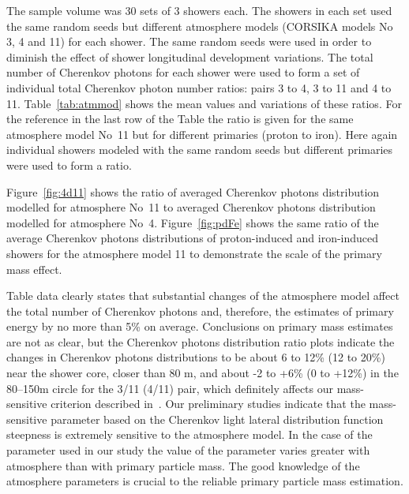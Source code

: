 \documentclass[universe,article,submit,moreauthors,pdftex]{Definitions/mdpi}
\begin{document}
\begin{paracol}{2}
The sample volume was 30 sets of 3 showers each. The showers in each set used the same random seeds but different atmosphere models (CORSIKA models No 3, 4 and 11) for each shower. The same random seeds were used in order to diminish the effect of shower longitudinal development variations. The total number of Cherenkov photons for each shower were used to form a set of individual total Cherenkov photon number ratios: pairs 3 to 4, 3 to 11 and 4 to 11. Table~\ref{tab:atmmod} shows the mean values and variations of these ratios. For the reference in the last row of the Table the ratio is given for the same atmosphere model No~11 but for different primaries (proton to iron). Here again individual showers modeled with the same random seeds but different primaries were used to form a ratio. 

Figure~\ref{fig:4d11} shows the ratio of averaged Cherenkov photons distribution modelled for atmosphere No~11 to averaged Cherenkov photons distribution modelled for atmosphere No~4. Figure~\ref{fig:pdFe} shows the same ratio of the average Cherenkov photons distributions of proton-induced and iron-induced showers for the atmosphere model 11 to demonstrate the scale of the primary mass effect.


Table data clearly states that substantial changes of the atmosphere model affect the total number of Cherenkov photons and, therefore, the estimates of primary energy by no more than 5\% on average. Conclusions on primary mass estimates are not as clear, but the Cherenkov photons distribution ratio plots indicate the changes in Cherenkov photons distributions to be about 6 to 12\% (12 to 20\%) near the shower core, closer than 80 m, and about -2 to +6\% (0 to +12\%) in the 80--150m circle for the 3/11 (4/11) pair, which definitely affects our mass-sensitive criterion described in~\cite{Ant15c}. Our preliminary studies indicate that the mass-sensitive parameter based on the Cherenkov light lateral distribution function steepness is extremely sensitive to the atmosphere model. In the case of the parameter used in our study the value of the parameter varies greater with atmosphere than with primary particle mass. The good knowledge of the atmosphere parameters is crucial to the reliable primary particle mass estimation.


\end{paracol}
\end{document}
